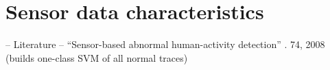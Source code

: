 \section{Sensor data characteristics}\label{sec:sensor_data_characteristics}

-- Literature --
``Sensor-based abnormal human-activity detection'' \cite{yin2008sensor}. 74, 2008 (builds one-class SVM of all normal traces) \\